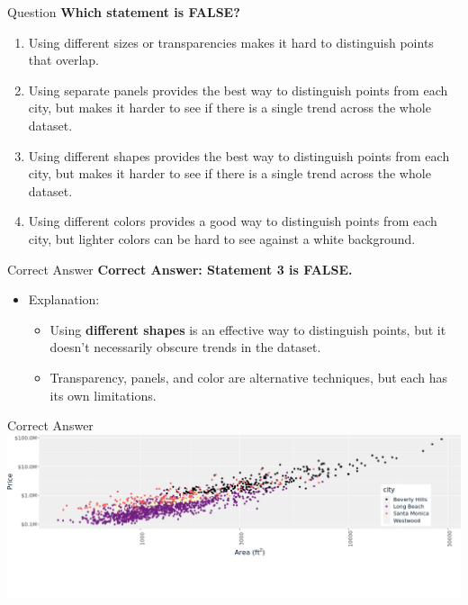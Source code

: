 \documentclass[
  ignorenonframetext,
]{beamer}
\providecommand{\tightlist}{%
  \setlength{\itemsep}{0pt}\setlength{\parskip}{0pt}}
\begin{document}
\begin{frame}{Question}
\label{question}
\textbf{Which statement is FALSE?}

\begin{enumerate}
\tightlist
\item
  Using different sizes or transparencies makes it hard to distinguish
  points that overlap.
\item
  Using separate panels provides the best way to distinguish points from
  each city, but makes it harder to see if there is a single trend
  across the whole dataset.
\item
  Using different shapes provides the best way to distinguish points
  from each city, but makes it harder to see if there is a single trend
  across the whole dataset.
\item
  Using different colors provides a good way to distinguish points from
  each city, but lighter colors can be hard to see against a white
  background.
\end{enumerate}
\end{frame}

\begin{frame}{Correct Answer}
\label{correct-answer-2}
\textbf{Correct Answer: Statement 3 is FALSE.}

\begin{itemize}
\tightlist
\item
  Explanation:

  \begin{itemize}
  \tightlist
  \item
    Using \textbf{different shapes} is an effective way to distinguish
    points, but it doesn't necessarily obscure trends in the dataset.
  \item
    Transparency, panels, and color are alternative techniques, but each
    has its own limitations.
  \end{itemize}
\end{itemize}
\end{frame}

\begin{frame}{Correct Answer}
\label{correct-answer-3}
\includegraphics{../images/im74.png}
\end{frame}
\end{document}
